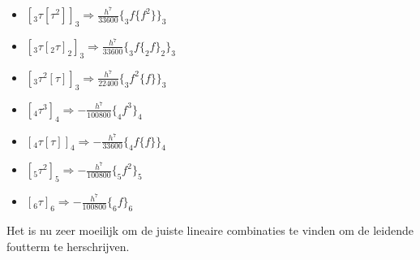 \documentclass[12pt]{article}
\begin{document}
\begin{itemize}
\begin{itemize}
        \item \([_3\tau[\tau^2]]_3\Rightarrow\frac{h^7}{33600}\{_3f\{f^2\}\}_3\)
        \item \([_3\tau[_2\tau]_2]_3\Rightarrow\frac{h^7}{33600}\{_3f\{_2f\}_2\}_3\)
        \item \([_3\tau^2[\tau]]_3\Rightarrow\frac{h^7}{22400}\{_3f^2\{f\}\}_3\)
        \item \([_4\tau^3]_4\Rightarrow-\frac{h^7}{100800}\{_4f^3\}_4\)
        \item \([_4\tau[\tau]]_4\Rightarrow-\frac{h^7}{33600}\{_4f\{f\}\}_4\)
        \item \([_5\tau^2]_5\Rightarrow-\frac{h^7}{100800}\{_5f^2\}_5\)
        \item \([_6\tau]_6\Rightarrow-\frac{h^7}{100800}\{_6f\}_6\)
    \end{itemize}
\end{itemize}
Het is nu zeer moeilijk om de juiste lineaire combinaties te vinden om de leidende foutterm te herschrijven.
\end{document}
